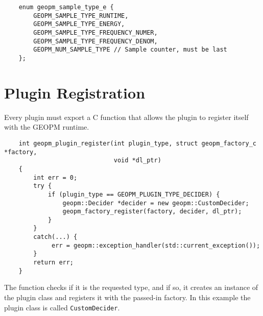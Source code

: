 \documentclass[11pt]{article}
\begin{document}
\begin{verbatim}
    enum geopm_sample_type_e {
        GEOPM_SAMPLE_TYPE_RUNTIME,
        GEOPM_SAMPLE_TYPE_ENERGY,
        GEOPM_SAMPLE_TYPE_FREQUENCY_NUMER,
        GEOPM_SAMPLE_TYPE_FREQUENCY_DENOM,
        GEOPM_NUM_SAMPLE_TYPE // Sample counter, must be last
    };
\end{verbatim}

\section{Plugin Registration}
Every plugin must export a C function that allows the plugin to
register itself with the GEOPM runtime.

\begin{verbatim}
    int geopm_plugin_register(int plugin_type, struct geopm_factory_c *factory,
                              void *dl_ptr)
    {
        int err = 0;
        try {
            if (plugin_type == GEOPM_PLUGIN_TYPE_DECIDER) {
                geopm::Decider *decider = new geopm::CustomDecider;
                geopm_factory_register(factory, decider, dl_ptr);
            }
        }
        catch(...) {
             err = geopm::exception_handler(std::current_exception());
        }
        return err;
    }
\end{verbatim}
The function checks if it is the requested type, and if so,
it creates an instance of the plugin class and registers it with the passed-in
factory. In this example the plugin class is called
\verb#CustomDecider#.
\end{document}

